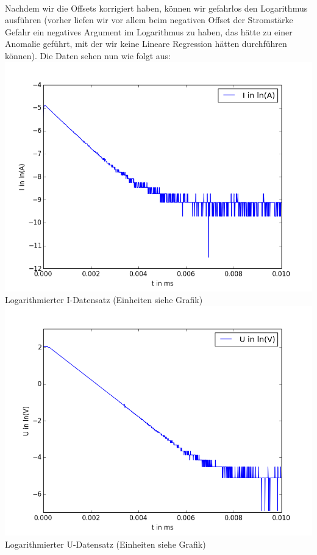 \documentclass[12pt,a4paper]{article}
\begin{document}
\\Nachdem wir die Offsets korrigiert haben, können wir gefahrlos den Logarithmus ausführen (vorher liefen wir vor allem beim negativen Offset der Stromstärke Gefahr ein negatives Argument im Logarithmus zu haben, das hätte zu einer Anomalie geführt, mit der wir keine Lineare Regression hätten durchführen können). Die Daten sehen nun wie folgt aus: \\
\includegraphics[scale=0.35]{ln(I)ggt.png}\\
Logarithmierter I-Datensatz (Einheiten siehe Grafik)\\
\includegraphics[scale=0.35]{ln(u)ggt.png}\\
Logarithmierter U-Datensatz (Einheiten siehe Grafik)\\
\end{document}
